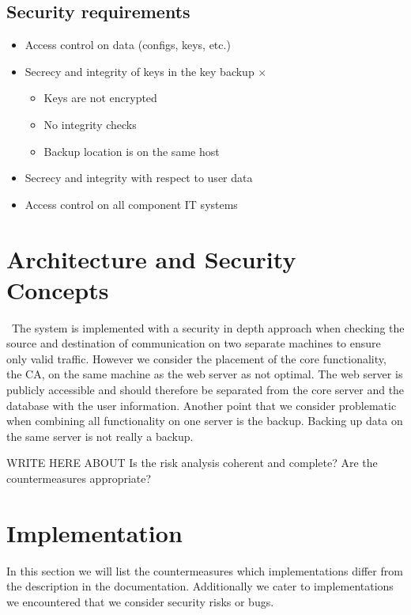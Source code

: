\documentclass{report}
\begin{document}
\subsection{Security requirements}
\begin{itemize}
\item Access control on data (configs, keys, etc.) \checkmark
\item Secrecy and integrity of keys in the key backup $\times$
	\begin{itemize}
	\item Keys are not encrypted
	\item No integrity checks
	\item Backup location is on the same host
	\end{itemize}
\item Secrecy and integrity with respect to user data \checkmark
\item Access control on all component IT systems \checkmark
\end{itemize}

\section{Architecture and Security Concepts}
\
The system is implemented with a security in depth approach when checking the source and destination of communication on two separate machines to ensure only valid traffic. However we consider the placement of the core functionality, the CA, on the same machine as the web server as not optimal. The web server is publicly accessible and should therefore be separated from the core server and the database with the user information. Another point that we consider problematic when combining all functionality on one server is the backup. Backing up data on the same server is not really a backup.


WRITE HERE ABOUT Is the risk analysis coherent and complete?   Are the
countermeasures appropriate?

\section{Implementation}

In this section we will list the countermeasures which implementations differ from the description in the documentation. Additionally we cater to implementations we encountered that we consider security risks or bugs.
\end{document}
